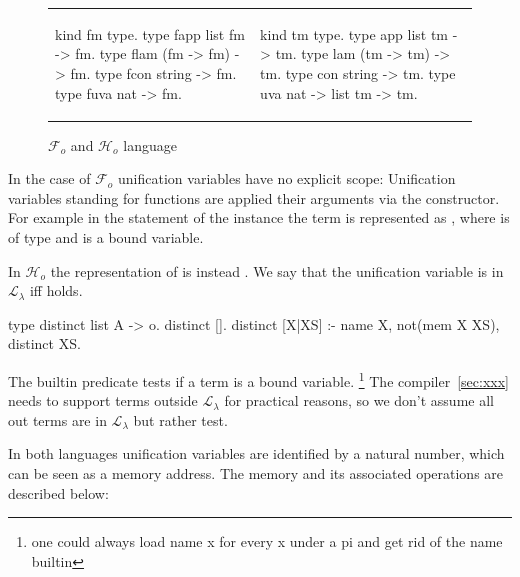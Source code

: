 \documentclass[sigconf,natbib=false]{acmart}
\newcommand{\llambda}{\ensuremath{\mathcal{L}_\lambda}\xspace}
\newcommand{\Fo}{\ensuremath{\mathcal{F}_{\!o}\xspace}} %
\newcommand{\Ho}{\ensuremath{\mathcal{H}_o}\xspace}
\begin{document}
\begin{figure}[H]
  \begin{tabular}{ll}
  \begin{minipage}{0.21\textwidth}
  \begin{elpicodetab}
kind fm type.
type fapp list fm -> fm.
type flam (fm -> fm) -> fm.
type fcon string -> fm.
type fuva nat -> fm.
\end{elpicodetab}
  \end{minipage}
  &
  \begin{minipage}{0.24\textwidth}
  \begin{elpicodetab}
kind tm type.
type app list tm -> tm.
type lam (tm -> tm) -> tm.
type con string -> tm.
type uva nat -> list tm -> tm.
  \end{elpicodetab}
  \end{minipage}
  \end{tabular}
  \caption{\Fo{} and \Ho language}\vspace{0.3em}
  \label{code:common-terms}
\end{figure}

\noindent
In the case of \Fo{} unification variables  have no explicit scope:
Unification variables standing for functions are applied their arguments
via the  constructor.
For example in the statement of the instance  the
term  is represented as , where 
is of type  and  is a bound variable.

In \Ho the representation of  is instead .
We say that the unification variable  is in \llambda iff
 holds.

\begin{elpicode}
type distinct list A -> o.
distinct [].
distinct [X|XS] :- name X, not(mem X XS),
  distinct XS.
\end{elpicode}

\noindent
The  builtin predicate tests if a term is a bound variable.
\footnote{one could always load name x for every x under a pi and get rid of the name builtin}
The
compiler~\ref{sec:xxx} needs to support terms outside \llambda for practical
reasons, so we don't assume all out terms are in \llambda but rather test.

In both languages unification variables are identified by a natural number,
which can be seen as a memory address. The memory and its associated
operations are described below:
\end{document}
